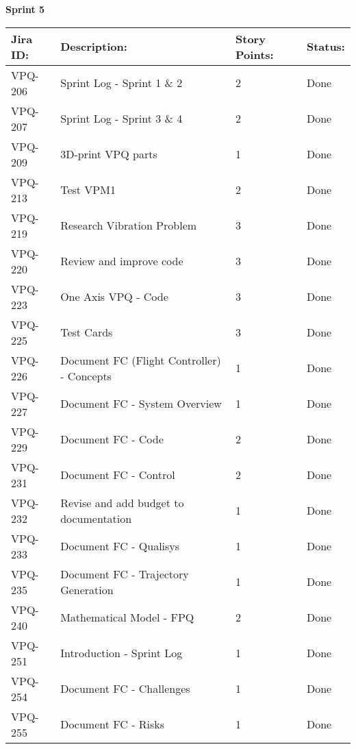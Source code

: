\begin{table}[ht]
\centering\textbf{Sprint 5}
\begin{tabularx}{\linewidth}{|m{1.5cm} m{8.3cm} m{1.5cm} m{3.5cm}|}
\hline
    \rowcolor{cadetgrey} 
     \textbf{Jira ID:} & \textbf{Description:} &  \textbf{Story Points:} & \textbf{Status: } \\ \hline
      VPQ-206 & Sprint Log - Sprint 1 \& 2 & 2\centering & Done  \\ 
\rowcolor{gainsboro} VPQ-207 &  Sprint Log - Sprint 3 \& 4 & 2\centering & Done  \\
      VPQ-209 & 3D-print VPQ parts & 1\centering & Done  \\
\rowcolor{gainsboro} VPQ-213 & Test VPM1 & 2\centering & Done  \\
      VPQ-219 & Research Vibration Problem & 3\centering & Done  \\
\rowcolor{gainsboro} VPQ-220 & Review and improve code & 3\centering & Done  \\
      VPQ-223 & One Axis VPQ - Code & 3\centering & Done  \\
\rowcolor{gainsboro} VPQ-225 & Test Cards & 3\centering & Done  \\    
      VPQ-226 & Document FC (Flight Controller) - Concepts & 1\centering & Done  \\
\rowcolor{gainsboro}  VPQ-227 & Document FC - System Overview & 1\centering & Done  \\
      VPQ-229 & Document FC - Code & 2\centering & Done  \\
\rowcolor{gainsboro} VPQ-231 & Document FC - Control & 2\centering & Done  \\    
      VPQ-232 & Revise and add budget to documentation & 1\centering & Done \\
\rowcolor{gainsboro}  VPQ-233 & Document FC - Qualisys & 1\centering & Done  \\
      VPQ-235 & Document FC - Trajectory Generation & 1\centering & Done  \\
\rowcolor{gainsboro} VPQ-240 & Mathematical Model - FPQ & 2\centering & Done  \\    
      VPQ-251 & Introduction - Sprint Log & 1\centering & Done  \\
\rowcolor{gainsboro}  VPQ-254 & Document FC - Challenges & 1\centering & Done  \\
      VPQ-255 & Document FC - Risks & 1\centering & Done  \\

\end{tabularx}
\end{table}
